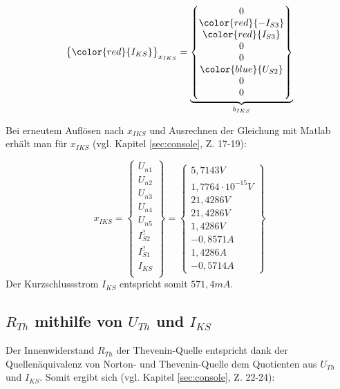 \documentclass[11pt]{scrartcl}
\begin{document}
\begin{align*}
{\begin{Bmatrix}
                                                                             \color{red}{I_{KS}}
                                                                           \end{Bmatrix}}_{x_{IKS}} =
  \underbrace{\begin{Bmatrix}
      0 \\
      \color{red}{-I_{S3}} \\
      \color{red}{I_{S3}}\\
      0 \\
      0 \\
      \color{blue}{U_{S2}} \\
      0 \\
      0
    \end{Bmatrix}}_{b_{IKS}}
\end{align*}

Bei erneutem Auflösen nach $x_{IKS}$ und Ausrechnen der Gleichung mit Matlab erhält man für $x_{IKS}$ (vgl. Kapitel \ref{sec:console}, Z. 17-19):

\begin{equation*}
  x_{IKS} = \begin{Bmatrix}
    U_{n1} \\
    U_{n2} \\
    U_{n3} \\
    U_{n4} \\
    U_{n5} \\
    I_{S2}^? \\
    I_{S1}^? \\
    I_{KS} \\
  \end{Bmatrix} =
  \begin{Bmatrix}
    5,7143 \unit{V} \\
    1,7764 \cdot 10^{-15} \unit{V} \\
    21,4286 \unit{V} \\
    21,4286 \unit{V} \\
    1,4286 \unit{V} \\
    -0,8571 \unit{A} \\
    1,4286 \unit{A} \\
    -0,5714 \unit{A}
    \end{Bmatrix}
\end{equation*}
Der Kurzschlussstrom $I_{KS}$ entspricht somit $571,4 \unit{mA}$.

\subsection{$R_{Th}$ mithilfe von $U_{Th}$ und $I_{KS}$}\label{sec:var1}
Der Innenwiderstand $R_{Th}$ der Thevenin-Quelle entspricht dank der Quellenäquivalenz von Norton- und Thevenin-Quelle
dem Quotienten aus $U_{Th}$ und $I_{KS}$.
Somit ergibt sich (vgl. Kapitel \ref{sec:console}, Z. 22-24):
\end{document}
